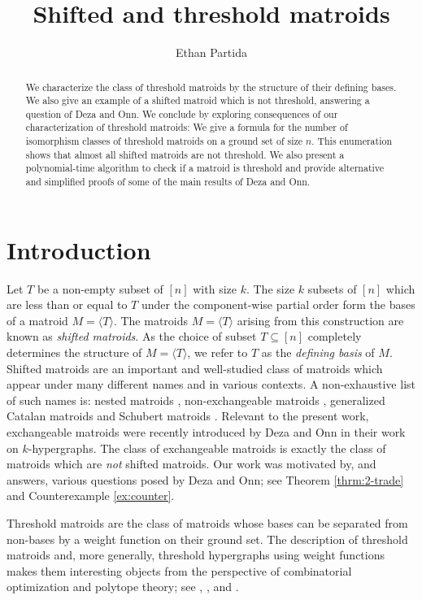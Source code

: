 \documentclass{amsart}
\title{Shifted and threshold matroids}
\author{Ethan Partida}
\theoremstyle{definition}
\theoremstyle{plain}
\begin{document}
\begin{abstract}
We characterize the class of threshold matroids by the structure of their defining bases. We also give an example of a shifted matroid which is not threshold, answering a question of Deza and Onn. We conclude by exploring consequences of our characterization of threshold matroids: We give a formula for the number of isomorphism classes of threshold matroids on a ground set of size $n$. This enumeration shows that almost all shifted matroids are not threshold. We also present a polynomial-time algorithm to check if a matroid is threshold and provide alternative and simplified proofs of some of the main results of Deza and Onn.
\end{abstract}
\maketitle
\section{Introduction}
Let $T$ be a non-empty subset of $[n]$ with size $k$. The size $k$ subsets of $[n]$ which are less than or equal to $T$ under the component-wise partial order form the bases of a matroid $M=\langle T \rangle$. The matroids $M=\langle T \rangle$ arising from this construction are known as \emph{shifted matroids}. As the choice of subset $T\subseteq [n]$ completely determines the structure of $M= \langle T \rangle$, we refer to $T$ as the \emph{defining basis} of $M$. Shifted matroids are an important and well-studied class of matroids which appear under many different names and in various contexts. A non-exhaustive list of such names is: nested matroids \cite{Hampe}, non-exchangeable matroids \cite{DO}, generalized Catalan matroids \cite{BONIN} and Schubert matroids \cite{Sohoni}. Relevant to the present work, exchangeable matroids were recently introduced by Deza and Onn \cite{DO} in their work on $k$-hypergraphs. The class of exchangeable matroids is exactly the class of matroids which are \emph{not} shifted matroids. Our work was motivated by, and answers, various questions posed by Deza and Onn; see Theorem \ref{thrm:2-trade} and Counterexample \ref{ex:counter}.

Threshold matroids are the class of matroids whose bases can be separated from non-bases by a weight function on their ground set. The description of threshold matroids and, more generally, threshold hypergraphs using weight functions makes them interesting objects from the perspective of combinatorial optimization and polytope theory; see \cite[Section $9$]{Boolean}, \cite{GK}, \cite[Section $2$]{BS} and \cite[Remark $7.8$]{CLLPPS}.
\end{document}
